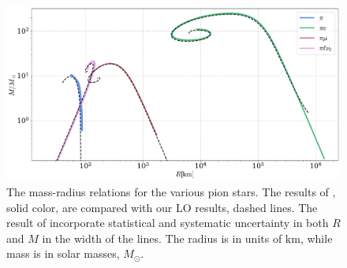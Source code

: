\begin{figure}[!htb]
    \centering
    \includegraphics[width=.9\textwidth]{../scripts/figurer/pion_star/mass_radius_brandt_all.pdf}
    \caption{
        The mass-radius relations for the various pion stars.
        The results of \citeauthor{brandtNewClassCompact2018}, solid color, are compared with our LO results, dashed lines.
        The result of \citeauthor{brandtNewClassCompact2018} incorporate statistical and systematic uncertainty in both $R$ and $M$ in the width of the lines.
        The radius is in units of $\text{km}$, while mass is in solar masses, $M_\odot$.
    }
    \label{fig: brandt mass-radius}
\end{figure}

